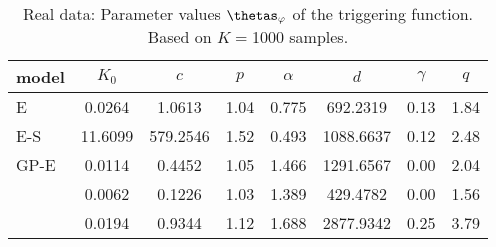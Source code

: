 \begin{table}[h!]
\centering
\small
\caption{Real data: Parameter values $\thetas_{\varphi}$ of the triggering function. Based on $K=$1000 samples.}
\begin{tabular}{lccccccc}
\hline
model & $K_0$ & $c$ & $p$ & $\alpha$ & $d$ & $\gamma$ & $q$  \\ \hline
E & 0.0264 & 1.0613 & 1.04 & 0.775 & 692.2319  & 0.13   & 1.84 \\ \hline
E-S  & 11.6099 & 579.2546 & 1.52 & 0.493 & 1088.6637  & 0.12   & 2.48 \\ \hline
GP-E  & 0.0114 & 0.4452 & 1.05 & 1.466 & 1291.6567  & 0.00   & 2.04 \\ 
  & 0.0062 & 0.1226 & 1.03 & 1.389 & 429.4782  & 0.00   & 1.56 \\ 
 & 0.0194 & 0.9344 & 1.12 & 1.688 & 2877.9342  & 0.25   & 3.79 \\ \hline

\end{tabular}
\end{table}
